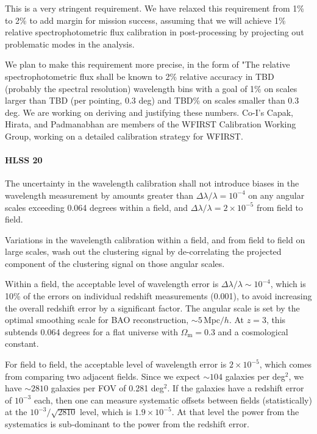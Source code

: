  This is a very stringent requirement. We have relaxed this requirement from 1\%
 to 2\% to add margin for mission success, assuming that we will achieve 1\%
 relative spectrophotometric flux calibration in post-processing by projecting
 out problematic modes in the analysis.

 We plan to make this requirement more precise, in the form of "The relative
 spectrophotometric flux shall be known to 2\% relative accuracy in TBD (probably
 the spectral resolution) wavelength bins with a goal of 1\% on scales larger
 than TBD (per pointing, 0.3 deg) and TBD\% on scales smaller than 0.3 deg.
 We are working on deriving and justifying these numbers.
 Co-I's Capak, Hirata, and Padmanabhan are members of the WFIRST Calibration Working Group, working on a detailed calibration strategy for WFIRST.


\paragraph{HLSS 20} The uncertainty in the wavelength calibration shall not introduce biases in the wavelength measurement by amounts greater than
 $\Delta\lambda/\lambda = 10^{-4}$ on any
 angular scales exceeding 0.064 degrees within a field, and
 $\Delta\lambda/\lambda = 2\times10^{-5}$ from
 field to field.

 Variations in the wavelength calibration within a field, and from field to field
 on large scales, wash out the clustering signal by de-correlating the projected
 component of the clustering signal on those angular scales.

 Within a field, the acceptable level of wavelength error is
 $\Delta\lambda/\lambda \sim 10^{-4}$, which
 is 10\% of the errors on individual redshift measurements (0.001), to avoid
 increasing the overall redshift error by a significant factor. The angular scale
 is set by the optimal smoothing scale for BAO reconstruction, $\sim 5 \,
 \mathrm{Mpc}/h$. At $z=3$, this subtends 0.064 degrees for a flat universe with
 $\Omega_\mathrm{m}=0.3$ and a cosmological constant.

 For field to field, the acceptable level of wavelength error is $2\times10^{-5}$, which comes from comparing two adjacent fields.  Since we expect $\sim 104$ galaxies per deg$^2$, we have $\sim 2810$ galaxies per FOV of 0.281 deg$^2$.  If the galaxies have a redshift error of $10^{-3}$ each, then one can measure systematic offsets between fields (statistically) at the $10^{-3}/\sqrt{2810}$ level, which is $1.9\times10^{-5}$. At that level the power from the systematics is sub-dominant to the power from the redshift error.

